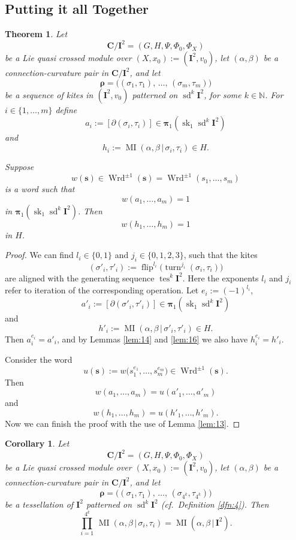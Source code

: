 \documentclass[10pt, a4paper]{amsart}
\newtheorem{thm}[equation]{Theorem}
\newtheorem{cor}[equation]{Corollary}
\theoremstyle{definition}
\numberwithin{equation}{section}
\newcommand{\opn}{\operatorname}
\newcommand{\mbf}[1]{\mathbf{#1}}
\newcommand{\mbb}[1]{\mathbb{#1}}
\newcommand{\tup}[1]{\textup{#1}}
\newcommand{\bsym}[1]{\boldsymbol{#1}}
\renewcommand{\vert}{\, | \,}
\newcommand{\N}{\mbb{N}}
\begin{document}
\subsection{Putting it all Together}

\begin{thm} \label{thm:7}
Let 
\[ \mbf{C} / \mbf{I}^2  = (G, H, \Psi, \Phi_0, \Phi_{X}) \]
be a Lie quasi crossed module over $(X, x_0) := (\mbf{I}^2, v_0)$,  let
$(\alpha, \beta)$ be a connection-curvature pair  in $\mbf{C} / \mbf{I}^2$,
and let 
\[ \bsym{\rho} = \bigl( (\sigma_1, \tau_1), \, \ldots, \, (\sigma_m, \tau_m) 
\bigr) \]
be a sequence of kites in $(\mbf{I}^2, v_0)$ patterned on 
$\opn{sd}^k \mbf{I}^2$, for some $k \in \N$.
For $i \in \{ 1, \ldots, m \}$ define
\[ a_i := [\partial (\sigma_i, \tau_i)] \in 
\bsym{\pi}_1(\opn{sk}_1 \opn{sd}^k \mbf{I}^2) \]
and
\[ h_i := \opn{MI} ( \alpha, \beta \vert \sigma_i, \tau_i) \in H . \]

Suppose 
\[  w(\bsym{s}) \in \opn{Wrd}^{\pm 1}(\bsym{s}) = \opn{Wrd}^{\pm 1}(s_1, \ldots,
s_m) \]
is a word such that 
\[ w(a_1, \ldots, a_m) =  1 \]
in $\bsym{\pi}_1(\opn{sk}_1 \opn{sd}^k \mbf{I}^2)$.
Then 
\[ w(h_1, \ldots, h_m) = 1 \]
in $H$.
\end{thm}

\begin{proof}
We can find $l_i \in \{ 0, 1 \}$ and 
$j_i \in \{ 0, 1, 2, 3 \}$, such that the kites
\[ (\sigma'_i, \tau'_i) := \opn{flip}^{l_i} \bigl( 
\opn{turn}^{j_i} (\sigma_i, \tau_i) \bigr) \]
are aligned with the generating sequence 
$\opn{tes}^k \mbf{I}^2$.  Here the exponents
$l_i$ and $j_i$ refer to iteration of the corresponding operation. Let
$e_i := (-1)^{l_i}$, 
\[ a'_i := [\partial (\sigma'_i, \tau'_i)] \in 
\bsym{\pi}_1(\opn{sk}_1 \opn{sd}^k \mbf{I}^2) \]
and 
\[ h'_i := \opn{MI} (\alpha, \beta \vert \sigma'_i, \tau'_i) \in H . \]
Then 
$a_i^{e_i} = a'_i$, 
and by Lemmas \ref{lem:14} and \ref{lem:16} we also have
$h_i^{e_i} = h'_i$.

Consider the word
\[ u(\bsym{s}) := w \bigl( s_1^{e_1}, \ldots, s_m^{e_m} \bigr)
\in \opn{Wrd}^{\pm 1}(\bsym{s}) . \]
Then
\[ w(a_1, \ldots, a_m) = u(a'_1, \ldots, a'_m) \]
and
\[ w(h_1, \ldots, h_m) =u(h'_1, \ldots, h'_m) . \]
Now we can finish the proof with the use of Lemma \ref{lem:13}.
\end{proof}

\begin{cor} \label{cor:2}
Let 
\[ \mbf{C} / \mbf{I}^2  = (G, H, \Psi, \Phi_0, \Phi_{X}) \]
be a Lie quasi crossed module over $(X, x_0) := (\mbf{I}^2, v_0)$,  let
$(\alpha, \beta)$ be a connection-curvature pair  in $\mbf{C} / \mbf{I}^2$,
and let 
\[ \bsym{\rho} = \bigl( (\sigma_1, \tau_1), \, \ldots, \, 
(\sigma_{4^k}, \tau_{4^k}) \bigr) \]
be a tessellation of $\mbf{I}^2$ patterned on 
$\opn{sd}^k \mbf{I}^2$ \tup{(}cf.\ Definition \tup{\ref{dfn:4}}\tup{)}.
Then 
\[ \prod_{i = 1}^{4^k} \, 
\opn{MI} ( \alpha, \beta \vert \sigma_i, \tau_i)  = 
\opn{MI} (\alpha, \beta \vert \mbf{I}^2) . \]
\end{cor}
\end{document}
